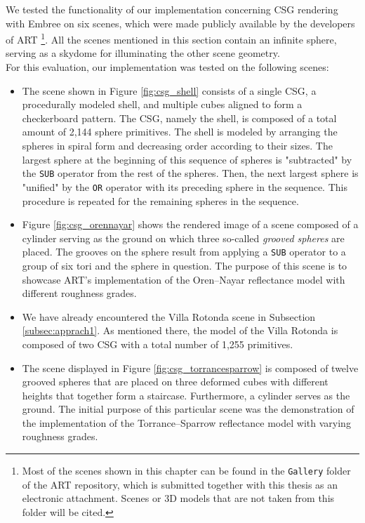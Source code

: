We tested the functionality of our implementation concerning CSG rendering with Embree on six scenes, which were made publicly available by the developers of ART \footnote{Most of the scenes shown in this chapter can be found in the \texttt{Gallery} folder of the ART repository, which is submitted together with this thesis as an electronic attachment. Scenes or 3D models that are not taken from this folder will be cited.}. All the scenes mentioned in this section contain an infinite sphere, serving as a skydome for illuminating the other scene geometry. 
\\

\noindent For this evaluation, our implementation was tested on the following scenes:
\begin{itemize}
	\setlength\itemsep{0.05em}
	
	\item The scene shown in Figure \ref{fig:csg_shell} consists of a single CSG, a procedurally modeled shell, and multiple cubes aligned to form a checkerboard pattern. The CSG, namely the shell, is composed of a total amount of 2,144 sphere primitives. The shell is modeled by arranging the spheres in spiral form and decreasing order according to their sizes. The largest sphere at the beginning of this sequence of spheres is "subtracted" by the \texttt{SUB} operator from the rest of the spheres. Then, the next largest sphere is "unified" by the \texttt{OR} operator with its preceding sphere in the sequence. This procedure is repeated for the remaining spheres in the sequence.
	
	\item  Figure \ref{fig:csg_orennayar} shows the rendered image of a scene composed of a cylinder serving as the ground on which three so-called \emph{grooved spheres} are placed. The grooves on the sphere result from applying a \texttt{SUB} operator to a group of six tori and the sphere in question.
	The purpose of this scene is to showcase ART's implementation of the Oren–Nayar reflectance model \cite{oren1994generalization} with different roughness grades.
	
	\item We have already encountered the Villa Rotonda scene in Subsection \ref{subsec:apprach1}. As mentioned there, the model of the Villa Rotonda is composed of two CSG with a total number of 1,255 primitives.
		
	\item The scene displayed in Figure \ref{fig:csg_torrancesparrow} is composed of twelve grooved spheres that are placed on three deformed cubes with different heights that together form a staircase. Furthermore, a cylinder serves as the ground. The initial purpose of this particular scene was the demonstration of the implementation of the Torrance–Sparrow reflectance model \cite{torrance1967theory} with varying roughness grades.
	

\end{itemize}
